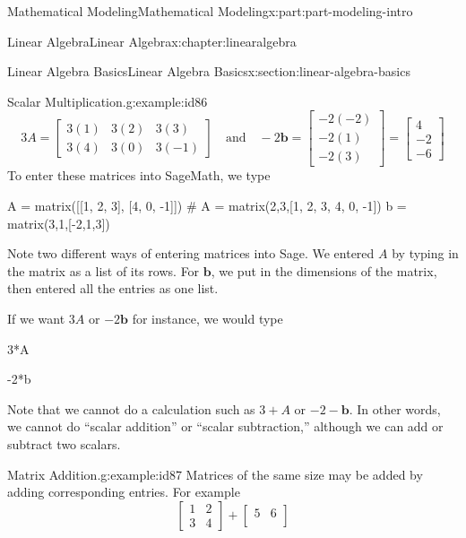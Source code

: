 \documentclass[oneside,10pt,]{book}
\numberwithin{equation}{section}
\begin{document}
\begin{partptx}{Mathematical Modeling}{}{Mathematical Modeling}{}{}{x:part:part-modeling-intro}
\begin{chapterptx}{Linear Algebra}{}{Linear Algebra}{}{}{x:chapter:linearalgebra}
\begin{sectionptx}{Linear Algebra Basics}{}{Linear Algebra Basics}{}{}{x:section:linear-algebra-basics}
\begin{example}{Scalar Multiplication.}{g:example:id86}
%
\begin{equation*}
3A = \begin{bmatrix}
3(1) & 3(2) & 3(3) \\
3(4) & 3(0) & 3(-1) 
\end{bmatrix} \quad\text{and} \quad 
-2\mathbf{b} = \begin{bmatrix}
-2(-2) \\
-2(1) \\
-2(3)
\end{bmatrix} = \begin{bmatrix}
4 \\
-2 \\
-6 \end{bmatrix}
\end{equation*}
To enter these matrices into SageMath, we type%
\begin{sageinput}
A = matrix([[1, 2, 3], [4, 0, -1]]) # A = matrix(2,3,[1, 2, 3, 4, 0, -1])
b = matrix(3,1,[-2,1,3])
\end{sageinput}
Note two different ways of entering matrices into Sage. We entered \(A\) by typing in the matrix as a list of its rows. For \(\mathbf{b}\), we put in the dimensions of the matrix, then entered all the entries as one list.%
\par
If we want \(3A\) or \(-2\mathbf{b}\) for instance, we would type%
\begin{sageinput}
3*A
\end{sageinput}
\begin{sageoutput}
[ 3  6  9]
[12  0 -3]
\end{sageoutput}
\begin{sageinput}
-2*b
\end{sageinput}
\begin{sageoutput}
[ 4]
[-2]
[-6]
\end{sageoutput}
Note that we cannot do a calculation such as \(3+A\) or \(-2-\mathbf{b}\). In other words, we cannot do ``scalar addition'' or ``scalar subtraction,'' although we can add or subtract two scalars.%
\end{example}
\begin{example}{Matrix Addition.}{g:example:id87}%
Matrices of the same size may be added by adding corresponding entries. For example%
%
\begin{equation*}
\begin{bmatrix}
1 & 2 \\
3 & 4
\end{bmatrix} + \begin{bmatrix}
5 & 6 \\

\end{bmatrix}
\end{equation*}
\end{example}
\end{sectionptx}
\end{chapterptx}
\end{partptx}
\end{document}
